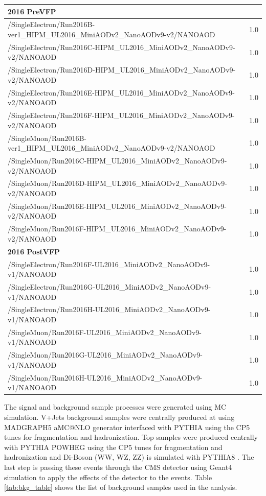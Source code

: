\begin{table}
{\begin{tabular}{ll}
\bf{2016 PreVFP} \\ \hline
/SingleElectron/Run2016B-ver1\_HIPM\_UL2016\_MiniAODv2\_NanoAODv9-v2/NANOAOD & 1.0\\
/SingleElectron/Run2016C-HIPM\_UL2016\_MiniAODv2\_NanoAODv9-v2/NANOAOD & 1.0\\
/SingleElectron/Run2016D-HIPM\_UL2016\_MiniAODv2\_NanoAODv9-v2/NANOAOD & 1.0\\
/SingleElectron/Run2016E-HIPM\_UL2016\_MiniAODv2\_NanoAODv9-v2/NANOAOD & 1.0\\
/SingleElectron/Run2016F-HIPM\_UL2016\_MiniAODv2\_NanoAODv9-v2/NANOAOD & 1.0\\

/SingleMuon/Run2016B-ver1\_HIPM\_UL2016\_MiniAODv2\_NanoAODv9-v2/NANOAOD & 1.0\\
/SingleMuon/Run2016C-HIPM\_UL2016\_MiniAODv2\_NanoAODv9-v2/NANOAOD & 1.0\\
/SingleMuon/Run2016D-HIPM\_UL2016\_MiniAODv2\_NanoAODv9-v2/NANOAOD & 1.0\\
/SingleMuon/Run2016E-HIPM\_UL2016\_MiniAODv2\_NanoAODv9-v2/NANOAOD & 1.0\\
/SingleMuon/Run2016F-HIPM\_UL2016\_MiniAODv2\_NanoAODv9-v2/NANOAOD & 1.0\\ \hline

\bf{2016 PostVFP} \\ \hline
/SingleElectron/Run2016F-UL2016\_MiniAODv2\_NanoAODv9-v1/NANOAOD & 1.0\\
/SingleElectron/Run2016G-UL2016\_MiniAODv2\_NanoAODv9-v1/NANOAOD & 1.0\\
/SingleElectron/Run2016H-UL2016\_MiniAODv2\_NanoAODv9-v1/NANOAOD & 1.0\\

/SingleMuon/Run2016F-UL2016\_MiniAODv2\_NanoAODv9-v1/NANOAOD & 1.0\\
/SingleMuon/Run2016G-UL2016\_MiniAODv2\_NanoAODv9-v1/NANOAOD & 1.0\\
/SingleMuon/Run2016H-UL2016\_MiniAODv2\_NanoAODv9-v1/NANOAOD & 1.0\\ \hline


\hline

\end{tabular}}
\label{tab:data_table}
\end{table}

The signal and background sample processes were generated using MC simulation. V+Jets background samples were centrally produced at using MADGRAPH5 aMC@NLO \cite{Alwall_2014} generator interfaced  with PYTHIA \cite{Sj_strand_2015} using the CP5  tunes for fragmentation and hadronization. Top samples were produced centrally with  PYTHIA POWHEG using the CP5  tunes for fragmentation and hadronization and Di-Boson (WW, WZ, ZZ) is simulated with PYTHIA8 \cite{Sj_strand_2015}. The last step is passing these events through the CMS detector using Geant4 \cite{Chatrchyan:cms_detetectors} simulation to apply the effects of the detector to the events. Table \ref{tab:bkg_table} shows the list of background samples used in the analysis.

